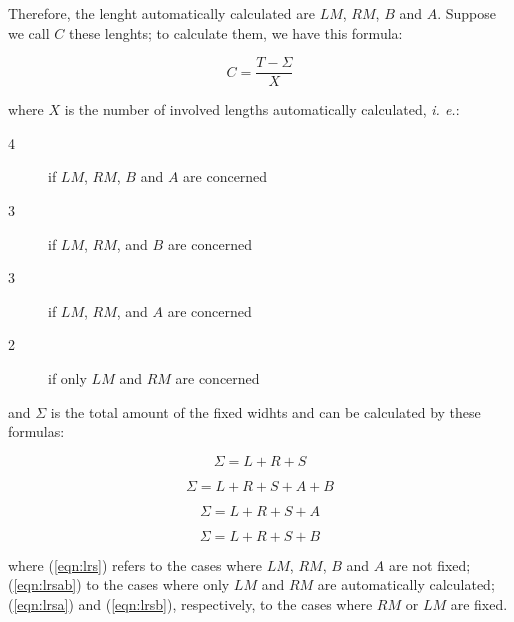 \documentclass[11pt,a4paper]{book}
\begin{document}
Therefore, the lenght automatically calculated are $LM$, $RM$, $B$ and $A$. Suppose we call $C$ these lenghts; to calculate them, we have this formula:

\begin{equation}
	C = \frac{T-Σ}{X}
\end{equation}

\noindent{}where $X$ is the number of involved lengths automatically calculated, \textit{i. e.}:

\begin{description}
	\item[4] if $LM$, $RM$, $B$ and $A$ are concerned
	\item[3] if $LM$, $RM$, and $B$ are concerned
	\item[3] if $LM$, $RM$, and $A$ are concerned
	\item[2] if only $LM$ and $RM$ are concerned
\end{description}

\noindent{}and $\Sigma$ is the total amount of the fixed widhts and can be calculated by these formulas:

\begin{equation}
\label{eqn:lrs}
	Σ = L+R+S
\end{equation}

\begin{equation}
\label{eqn:lrsab}
	Σ = L + R + S + A + B
\end{equation}

\begin{equation}
\label{eqn:lrsa}
	Σ = L+R+S+A
\end{equation}

\begin{equation}
\label{eqn:lrsb}
	Σ = L+R+S+B
\end{equation}

\noindent{}where (\ref{eqn:lrs}) refers to the cases where $LM$, $RM$, $B$ and $A$ are not fixed; (\ref{eqn:lrsab}) to the cases where only $LM$ and $RM$ are automatically calculated; (\ref{eqn:lrsa}) and (\ref{eqn:lrsb}), respectively, to the cases where $RM$ or $LM$ are fixed.
\end{document}
